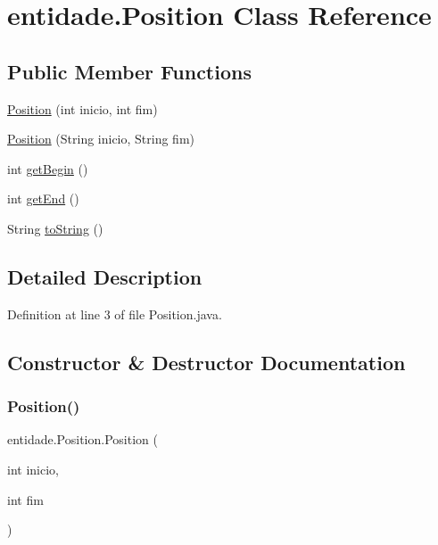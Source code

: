 \hypertarget{classentidade_1_1Position}{}\section{entidade.\+Position Class Reference}
\label{classentidade_1_1Position}
\subsection*{Public Member Functions}
\begin{DoxyCompactItemize}
\item 
\hyperlink{classentidade_1_1Position_a5c7ad4b5f26134b148dd56afa6bdcc60}{Position} (int inicio, int fim)
\item 
\hyperlink{classentidade_1_1Position_a2105dcad51d3f4924d5f0770958c529e}{Position} (String inicio, String fim)
\item 
int \hyperlink{classentidade_1_1Position_a1aa71cecbffd53debbe94973af2cca8c}{get\+Begin} ()
\item 
int \hyperlink{classentidade_1_1Position_aac6cfcd661388cf3faa47b6c80956e66}{get\+End} ()
\item 
String \hyperlink{classentidade_1_1Position_a65d216cd9c1de82bf23771f01a34c793}{to\+String} ()
\end{DoxyCompactItemize}


\subsection{Detailed Description}


Definition at line 3 of file Position.\+java.



\subsection{Constructor \& Destructor Documentation}
\hypertarget{classentidade_1_1Position_a5c7ad4b5f26134b148dd56afa6bdcc60}{}\label{classentidade_1_1Position_a5c7ad4b5f26134b148dd56afa6bdcc60} 
\subsubsection{\texorpdfstring{Position()}{Position()}\hspace{0.1cm}{\footnotesize\ttfamily [1/2]}}
{\footnotesize\ttfamily entidade.\+Position.\+Position (\begin{DoxyParamCaption}\item[{int}]{inicio,  }\item[{int}]{fim }\end{DoxyParamCaption})}



